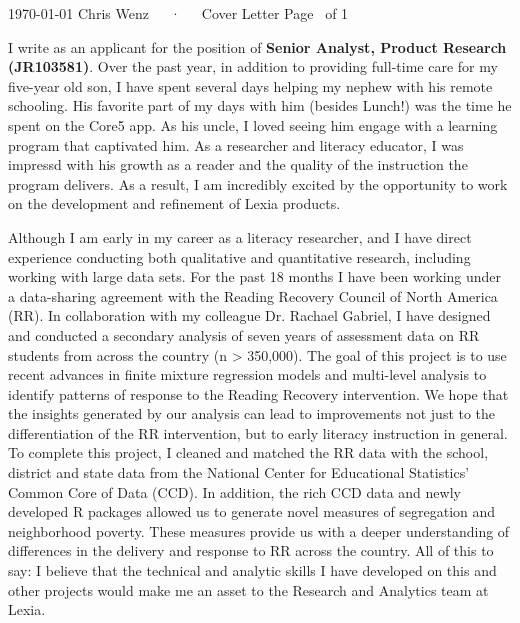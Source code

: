 \documentclass[10pt, a4paper]{awesome-cv}
\begin{document}
\makecvheader[C]

\makecvfooter
  {\today}
  {Chris Wenz~~~·~~~Cover Letter}
  {Page \thepage\ of 1}
\makelettertitle

\begin{cvletter}

I write as an applicant for the position of \textbf{Senior Analyst, Product Research (JR103581)}. Over the past year, in addition to providing full-time care for my five-year old son, I have spent several days helping my nephew with his remote schooling. His favorite part of my days with him (besides Lunch!) was the time he spent on the Core5 app. As his uncle, I loved seeing him engage with a learning program that captivated him. As a researcher and literacy educator, I was impressd with his growth as a reader and the quality of the instruction the program delivers. As a result, I am incredibly excited by the opportunity to work on the development and refinement of Lexia products.

Although I am early in my career as a literacy researcher, and I have direct experience conducting both qualitative and quantitative research, including working with large data sets. For the past 18 months I have been working under a data-sharing agreement with the Reading Recovery Council of North America (RR). In collaboration with my colleague Dr. Rachael Gabriel, I have designed and conducted a secondary analysis of seven years of assessment data on RR students from across the country (n > 350,000). The goal of this project is to use recent advances in finite mixture regression models and multi-level analysis to identify patterns of response to the Reading Recovery intervention. We hope that the insights generated by our analysis can lead to improvements not just to the differentiation of the RR intervention, but to early literacy instruction in general. To complete this project, I cleaned and matched the RR data with the school, district and state data from the National Center for Educational Statistics' Common Core of Data (CCD). In addition, the rich CCD data and newly developed R packages allowed us to generate novel measures of segregation and neighborhood poverty. These measures provide us with a deeper understanding of differences in the delivery and response to RR across the country. All of this to say: I believe that the technical and analytic skills I have developed on this and other projects would make me an asset to the Research and Analytics team at Lexia. 


\end{cvletter}
\end{document}
